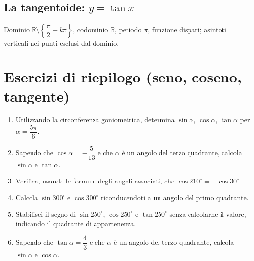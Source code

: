 \documentclass[11pt,a4paper]{article}
\begin{document}
\subsection{La tangentoide: $y=\tan x$}
\begin{center}
\end{center}
Dominio $\mathbb{R}\setminus\left\{\dfrac{\pi}{2}+k\pi\right\}$, codominio $\mathbb{R}$, periodo $\pi$, funzione dispari; asintoti verticali nei punti esclusi dal dominio.

\section{Esercizi di riepilogo (seno, coseno, tangente)}

\begin{enumerate}[label=\arabic*)]
\item Utilizzando la circonferenza goniometrica, determina $\sin\alpha$, $\cos\alpha$, $\tan\alpha$ per $\alpha = \dfrac{5\pi}{6}$.
\item Sapendo che $\cos\alpha = -\dfrac{5}{13}$ e che $\alpha$ \`e un angolo del terzo quadrante, calcola $\sin\alpha$ e $\tan\alpha$.
\item Verifica, usando le formule degli angoli associati, che $\cos 210^\circ = -\cos 30^\circ$.
\item Calcola $\sin 300^\circ$ e $\cos 300^\circ$ riconducendoti a un angolo del primo quadrante.
\item Stabilisci il segno di $\sin 250^\circ$, $\cos 250^\circ$ e $\tan 250^\circ$ senza calcolarne il valore, indicando il quadrante di appartenenza.
\item Sapendo che $\tan\alpha = \dfrac{4}{3}$ e che $\alpha$ \`e un angolo del terzo quadrante, calcola $\sin\alpha$ e $\cos\alpha$.
\end{enumerate}
\end{document}
